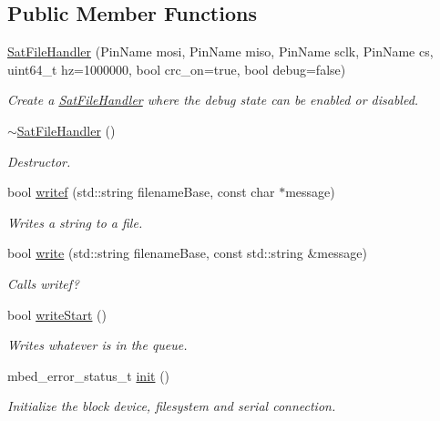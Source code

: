 \subsection*{Public Member Functions}
\begin{DoxyCompactItemize}
\item 
\mbox{\hyperlink{class_sat_file_handler_a077c457c3daa568f5415b3d03d01a2a2}{Sat\+File\+Handler}} (Pin\+Name mosi, Pin\+Name miso, Pin\+Name sclk, Pin\+Name cs, uint64\+\_\+t hz=1000000, bool crc\+\_\+on=true, bool debug=false)
\begin{DoxyCompactList}\small\item\em Create a \mbox{\hyperlink{class_sat_file_handler}{Sat\+File\+Handler}} where the debug state can be enabled or disabled. \end{DoxyCompactList}\item 
\mbox{\hyperlink{class_sat_file_handler_ac16f6dbdc038a207f3fd3e572f2df496}{$\sim$\+Sat\+File\+Handler}} ()
\begin{DoxyCompactList}\small\item\em Destructor. \end{DoxyCompactList}\item 
bool \mbox{\hyperlink{class_sat_file_handler_a355361c4ec4692c5b533740121976eb2}{writef}} (std\+::string filename\+Base, const char $\ast$message)
\begin{DoxyCompactList}\small\item\em Writes a string to a file. \end{DoxyCompactList}\item 
bool \mbox{\hyperlink{class_sat_file_handler_a54f30111dd898bc6ce1e0c0ce6a82350}{write}} (std\+::string filename\+Base, const std\+::string \&message)
\begin{DoxyCompactList}\small\item\em Calls writef? \end{DoxyCompactList}\item 
bool \mbox{\hyperlink{class_sat_file_handler_a458d6cf20f9384c4ef1c0ce3f57d1ab1}{write\+Start}} ()
\begin{DoxyCompactList}\small\item\em Writes whatever is in the queue. \end{DoxyCompactList}\item 
mbed\+\_\+error\+\_\+status\+\_\+t \mbox{\hyperlink{class_sat_file_handler_aacd220dabbabf695b7ee32e526baeb5e}{init}} ()
\begin{DoxyCompactList}\small\item\em Initialize the block device, filesystem and serial connection. \end{DoxyCompactList}\item 

\end{DoxyCompactItemize}

